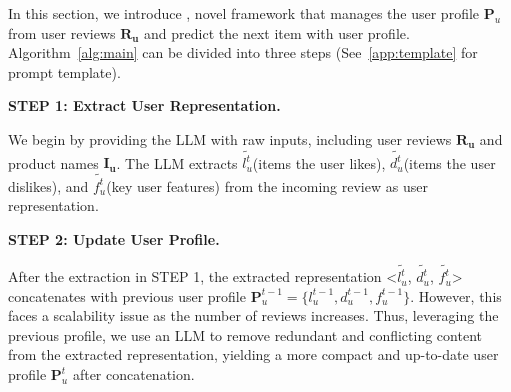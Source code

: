 In this section, we introduce \myalg{}, novel framework that manages the user profile $\mathbf{P}_u$ from user reviews $\mathbf{R_u}$ and predict the next item with user profile. Algorithm~\ref{alg:main} can be divided into three steps (See~\autoref{app:template} for prompt template).

\smallskip
\noindent \textbf{STEP 1: Extract User Representation. }

\noindent We begin by providing the LLM with raw inputs, including user reviews $\mathbf{R_u}$ and product names $\mathbf{I_u}$. The LLM extracts $\tilde{l_u^t}$(items the user likes), $\tilde{d_u^t}$(items the user dislikes), and $\tilde{f_u^t}$(key user features) from the incoming review as user representation.




\smallskip
\noindent \textbf{STEP 2: Update User Profile. }


\noindent After the extraction in STEP 1, the extracted representation <$\tilde{l_u^t}$, $\tilde{d_u^t}$, $\tilde{f_u^t}$> concatenates with previous user profile $\mathbf{P}_u^{t-1} = \{l_u^{t-1}, d_u^{t-1}, f_u^{t-1} \}$. However, this faces a scalability issue as the number of reviews increases. Thus, leveraging the previous profile, we use an LLM to remove redundant and conflicting content from the extracted representation, yielding a more compact and up-to-date user profile $\mathbf{P}_u^t$ after concatenation.


